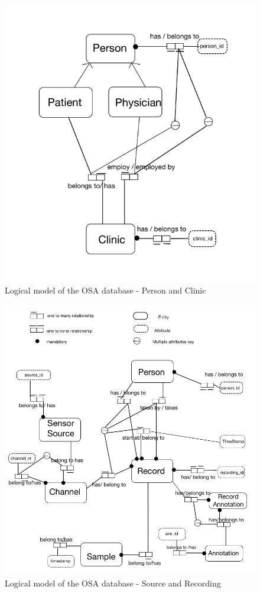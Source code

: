 \begin{figure}
    \centering
    \includegraphics[width=1.0\textwidth]{images/LogicalModelDB1.png}
    \caption{Logical model of the OSA database - Person and Clinic \cite{viet}}
    \label{fig:Figures/LogicalModelDB1}
\end{figure}
\begin{figure}
    \centering
    \includegraphics[width=1.0\textwidth]{images/LogicalModelDB2.png}
    \caption{Logical model of the OSA database - Source and Recording \cite{viet}}
    \label{fig:Figures/LogicalModelDB2}
\end{figure}